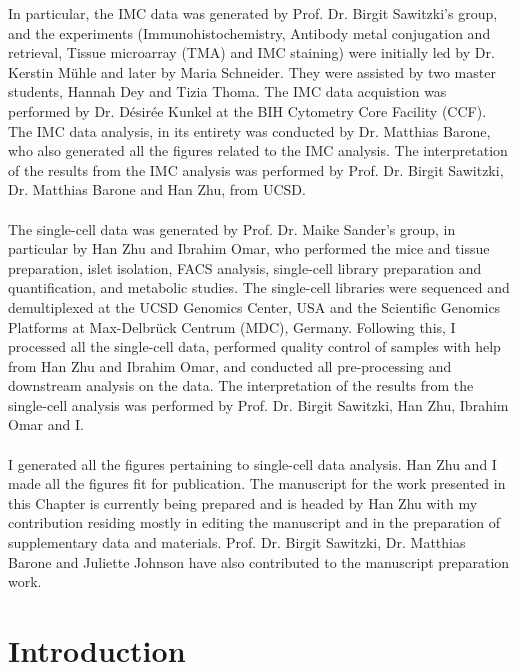\begin{Comment2}
In particular, the IMC data was generated by Prof. Dr. Birgit Sawitzki's group, and the experiments (Immunohistochemistry, Antibody metal conjugation and retrieval, Tissue microarray (TMA) and IMC staining) were initially led by Dr. Kerstin Mühle and later by Maria Schneider. They were assisted by two master students, Hannah Dey and Tizia Thoma. The IMC data acquistion was performed by Dr. Désirée Kunkel at the BIH Cytometry Core Facility (CCF). The IMC data analysis, in its entirety was conducted by Dr. Matthias Barone, who also generated all the figures related to the IMC analysis. The interpretation of the results from the IMC analysis was performed by Prof. Dr. Birgit Sawitzki, Dr. Matthias Barone and Han Zhu, from UCSD.\\\\
The single-cell data was generated by Prof. Dr. Maike Sander's group, in particular by Han Zhu and Ibrahim Omar, who performed the mice and tissue preparation, islet isolation, FACS analysis, single-cell library preparation and quantification, and metabolic studies. The single-cell libraries were sequenced and demultiplexed at the UCSD Genomics Center, USA and the Scientific Genomics Platforms at Max-Delbrück Centrum (MDC), Germany. Following this, I processed all the single-cell data, performed quality control of samples with help from Han Zhu and Ibrahim Omar, and conducted all pre-processing and downstream analysis on the data. The interpretation of the results from the single-cell analysis was performed by Prof. Dr. Birgit Sawitzki, Han Zhu, Ibrahim Omar and I.\\\\
I generated all the figures pertaining to single-cell data analysis. Han Zhu and I made all the figures fit for publication. The manuscript for the work presented in this Chapter is currently being prepared and is headed by Han Zhu with my contribution residing mostly in editing the manuscript and in the preparation of supplementary data and materials. Prof. Dr. Birgit Sawitzki, Dr. Matthias Barone and Juliette Johnson have also contributed to the manuscript preparation work.\\
\end{Comment2}

\clearpage

\section{Introduction}
\label{sec:endodiff_intro}

